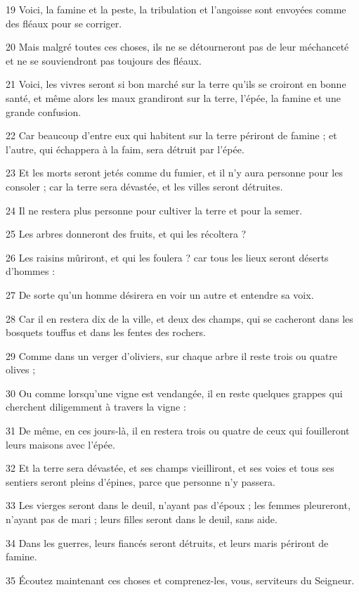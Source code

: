 \par 19 Voici, la famine et la peste, la tribulation et l'angoisse sont envoyées comme des fléaux pour se corriger.
\par 20 Mais malgré toutes ces choses, ils ne se détourneront pas de leur méchanceté et ne se souviendront pas toujours des fléaux.
\par 21 Voici, les vivres seront si bon marché sur la terre qu'ils se croiront en bonne santé, et même alors les maux grandiront sur la terre, l'épée, la famine et une grande confusion.
\par 22 Car beaucoup d'entre eux qui habitent sur la terre périront de famine ; et l'autre, qui échappera à la faim, sera détruit par l'épée.
\par 23 Et les morts seront jetés comme du fumier, et il n'y aura personne pour les consoler ; car la terre sera dévastée, et les villes seront détruites.
\par 24 Il ne restera plus personne pour cultiver la terre et pour la semer.
\par 25 Les arbres donneront des fruits, et qui les récoltera ?
\par 26 Les raisins mûriront, et qui les foulera ? car tous les lieux seront déserts d'hommes :
\par 27 De sorte qu'un homme désirera en voir un autre et entendre sa voix.
\par 28 Car il en restera dix de la ville, et deux des champs, qui se cacheront dans les bosquets touffus et dans les fentes des rochers.
\par 29 Comme dans un verger d'oliviers, sur chaque arbre il reste trois ou quatre olives ;
\par 30 Ou comme lorsqu'une vigne est vendangée, il en reste quelques grappes qui cherchent diligemment à travers la vigne :
\par 31 De même, en ces jours-là, il en restera trois ou quatre de ceux qui fouilleront leurs maisons avec l'épée.
\par 32 Et la terre sera dévastée, et ses champs vieilliront, et ses voies et tous ses sentiers seront pleins d'épines, parce que personne n'y passera.
\par 33 Les vierges seront dans le deuil, n'ayant pas d'époux ; les femmes pleureront, n'ayant pas de mari ; leurs filles seront dans le deuil, sans aide.
\par 34 Dans les guerres, leurs fiancés seront détruits, et leurs maris périront de famine.
\par 35 Écoutez maintenant ces choses et comprenez-les, vous, serviteurs du Seigneur.
